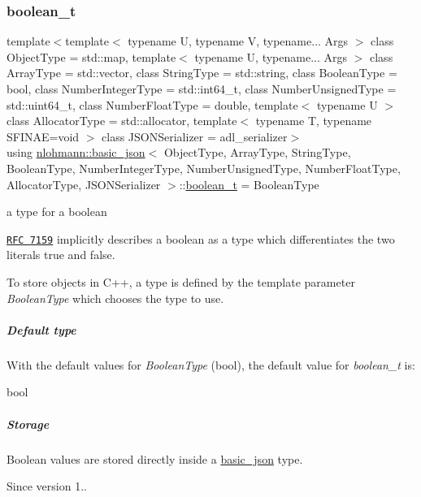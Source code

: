 \subsubsection{\texorpdfstring{boolean\+\_\+t}{boolean\_t}}
{\footnotesize\ttfamily template$<$template$<$ typename U, typename V, typename... Args $>$ class Object\+Type = std\+::map, template$<$ typename U, typename... Args $>$ class Array\+Type = std\+::vector, class String\+Type  = std\+::string, class Boolean\+Type  = bool, class Number\+Integer\+Type  = std\+::int64\+\_\+t, class Number\+Unsigned\+Type  = std\+::uint64\+\_\+t, class Number\+Float\+Type  = double, template$<$ typename U $>$ class Allocator\+Type = std\+::allocator, template$<$ typename T, typename S\+F\+I\+N\+A\+E=void $>$ class J\+S\+O\+N\+Serializer = adl\+\_\+serializer$>$ \\
using \mbox{\hyperlink{classnlohmann_1_1basic__json}{nlohmann\+::basic\+\_\+json}}$<$ Object\+Type, Array\+Type, String\+Type, Boolean\+Type, Number\+Integer\+Type, Number\+Unsigned\+Type, Number\+Float\+Type, Allocator\+Type, J\+S\+O\+N\+Serializer $>$\+::\mbox{\hyperlink{classnlohmann_1_1basic__json_a4c919102a9b4fe0d588af64801436082}{boolean\+\_\+t}} =  Boolean\+Type}



a type for a boolean 

\href{http://rfc7159.net/rfc7159}{\tt R\+FC 7159} implicitly describes a boolean as a type which differentiates the two literals {\ttfamily true} and {\ttfamily false}.

To store objects in C++, a type is defined by the template parameter {\itshape Boolean\+Type} which chooses the type to use.

\subparagraph*{Default type}

With the default values for {\itshape Boolean\+Type} ({\ttfamily bool}), the default value for {\itshape boolean\+\_\+t} is\+:


\begin{DoxyCode}
\textcolor{keywordtype}{bool}
\end{DoxyCode}


\subparagraph*{Storage}

Boolean values are stored directly inside a \mbox{\hyperlink{classnlohmann_1_1basic__json}{basic\+\_\+json}} type.

\begin{DoxySince}{Since}
version 1.. 
\end{DoxySince}
\mbox{\label{classnlohmann_1_1basic__json_a9a0aced019cb1d65bb49703406c84970}} 
